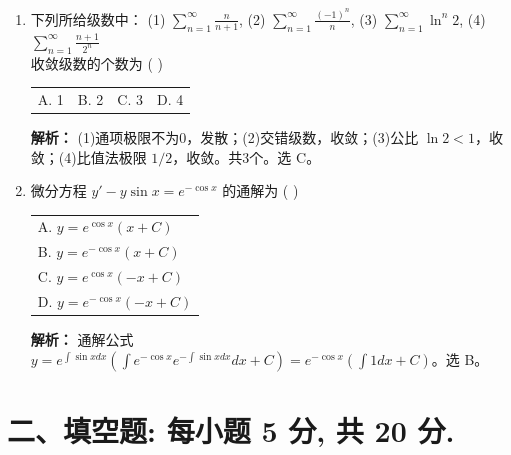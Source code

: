 \documentclass[10pt, a3paper, landscape, twocolumn]{article}
\begin{document}
\begin{enumerate}
    \item 下列所给级数中：
    (1) $\sum\limits_{n=1}^\infty \frac{n}{n+1}$, \quad
    (2) $\sum\limits_{n=1}^\infty \frac{(-1)^n}{n}$, \quad
    (3) $\sum\limits_{n=1}^\infty \ln^n 2$, \quad
    (4) $\sum\limits_{n=1}^\infty \frac{n+1}{2^n}$ \\
    收敛级数的个数为 ( \quad ) \\
    \begin{tabularx}{\linewidth}{@{} *{4}{X} @{}}
        A. 1 & B. 2 & C. 3 & D. 4
    \end{tabularx}
    {\color{red} \footnotesize \textbf{解析：} (1)通项极限不为0，发散；(2)交错级数，收敛；(3)公比 $\ln 2 < 1$，收敛；(4)比值法极限 $1/2$，收敛。共3个。选 C。}

    \item 微分方程 $y' - y\sin x = e^{-\cos x}$ 的通解为 ( \quad ) \\
    \begin{tabularx}{\linewidth}{@{} *{1}{X} @{}}
        A. $y = e^{\cos x}(x+C)$ \\
        B. $y = e^{-\cos x}(x+C)$ \\
        C. $y = e^{\cos x}(-x+C)$ \\
        D. $y = e^{-\cos x}(-x+C)$
    \end{tabularx}
    {\color{red} \footnotesize \textbf{解析：} 通解公式 $y=e^{\int \sin x dx}(\int e^{-\cos x}e^{-\int \sin x dx}dx + C) = e^{-\cos x}(\int 1 dx + C)$。选 B。}
\end{enumerate}

\section*{二、填空题: 每小题 5 分, 共 20 分.}
\end{document}
